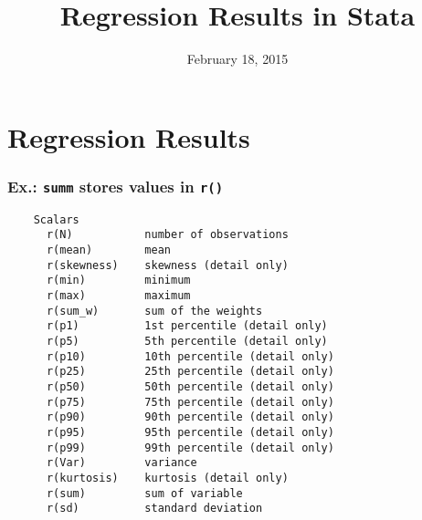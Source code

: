 

\title{Regression Results in Stata}

\date[]{February 18, 2015}



\frame{\titlepage}

\section{Regression Results}
\frame{\tableofcontents[currentsection]}


\begin{frame}[fragile]
	\frametitle{Ex.: \texttt{summ} stores values in \texttt{r()}}
	\scriptsize
	\begin{verbatim}
	Scalars   
	  r(N)           number of observations
	  r(mean)        mean
	  r(skewness)    skewness (detail only)
	  r(min)         minimum
	  r(max)         maximum
	  r(sum_w)       sum of the weights
	  r(p1)          1st percentile (detail only)
	  r(p5)          5th percentile (detail only)
	  r(p10)         10th percentile (detail only)
	  r(p25)         25th percentile (detail only)
	  r(p50)         50th percentile (detail only)
	  r(p75)         75th percentile (detail only)
	  r(p90)         90th percentile (detail only)
	  r(p95)         95th percentile (detail only)
	  r(p99)         99th percentile (detail only)
	  r(Var)         variance
	  r(kurtosis)    kurtosis (detail only)
	  r(sum)         sum of variable
	  r(sd)          standard deviation
	
	\end{verbatim}
\end{frame}


